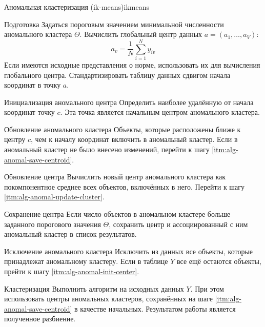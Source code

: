 \documentclass[12pt]{diploma}
\begin{document}
	\begin{algorithm}{Аномальная кластеризация (ik-means)}{ikmeans}	
		\begin{astep}{Подготовка}
			Задаться пороговым значением минимальной численности аномального кластера $ \Theta $. Вычислить глобальный центр данных $ a = (a_1,\ldots,a_V) $:
			\begin{equation*}
				a_v=\frac{1}{N} \sum_{i=1}^{N}y_{iv}
			\end{equation*}
			Если имеются исходные представления о норме, использовать их для вычисления глобального центра. Стандартизировать таблицу данных сдвигом начала координат в точку $ a $.
		\end{astep}
		\begin{astep}{Инициализация аномального центра \label{itm:alg-anomal-init-center}}
			Определить наиболее удалённую от начала координат точку $ c $. Эта точка является начальным центром аномального кластера. 
		\end{astep}
		\begin{astep}{Обновление аномального кластера \label{itm:alg-anomal-update-cluster}}
			Объекты, которые расположены ближе к центру $ c $, чем к началу координат включить в аномальный кластер. Если в аномальный кластер не было внесено изменений, перейти к шагу  \ref{itm:alg-anomal-save-centroid}.
		\end{astep}
		\begin{astep}{Обновление центра \label{itm:alg-anomal-update-center}}
			Вычислить новый центр аномального кластера как покомпонентное среднее всех объектов, включённых в него.  Перейти к шагу \ref{itm:alg-anomal-update-cluster}.
		\end{astep}
		\begin{astep}{Сохранение центра \label{itm:alg-anomal-save-centroid}}
			Если число объектов в аномальном кластере больше заданного порогового значения $ \Theta $, сохранить центр и ассоциированный с ним аномальный кластер в список результатов.
		\end{astep}
		\begin{astep}{Исключение аномального кластера}
			Исключить из данных все объекты, которые принадлежат аномальному кластеру.  Если в таблице $ Y $ все ещё остаются объекты, прейти к шагу \ref{itm:alg-anomal-init-center}.
		\end{astep}
		\begin{astep}{Кластеризация}
			Выполнить алгоритм \kmeans \cite{k-means-canonical} на исходных данных $ Y $. При этом использовать центры аномальных кластеров, сохранённых на шаге \ref{itm:alg-anomal-save-centroid} в качестве начальных. Результатом работы \ikmeans является полученное разбиение.
		\end{astep}
	\end{algorithm}
\end{document}

